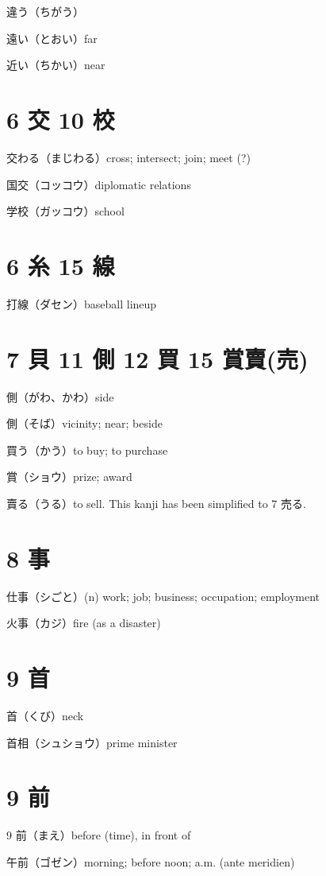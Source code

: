 違う（ちがう）

遠い（とおい）far

近い（ちかい）near

\section{6 交 10 校}

交わる（まじわる）cross; intersect; join; meet (?)

国交（コッコウ）diplomatic relations

学校（ガッコウ）school

\section{6 糸 15 線}

打線（ダセン）baseball lineup

\section{7 貝 11 側 12 買 15 賞賣(売)}

側（がわ、かわ）side

側（そば）vicinity; near; beside

買う（かう）to buy; to purchase

賞（ショウ）prize; award

賣る（うる）to sell.
This kanji has been simplified to 7 売る.

\section{8 事}

仕事（シごと）(n) work; job; business; occupation; employment

火事（カジ）fire (as a disaster)

\section{9 首}

首（くび）neck

首相（シュショウ）prime minister

\section{9 前}

9 前（まえ）before (time), in front of

午前（ゴゼン）morning; before noon; a.m. (ante meridien)

